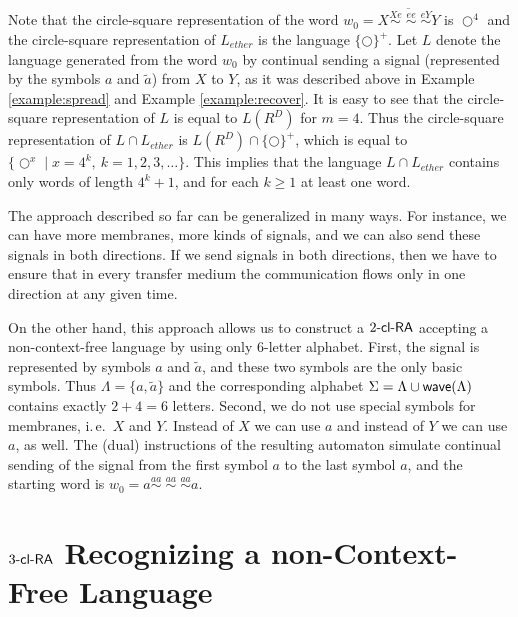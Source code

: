 Note that the circle-square representation of the word $w_0 = \overline{X \stackrel{Xe}{\sim} \; \stackrel{ee}{\sim} \; \stackrel{eY}{\sim} Y}$ is $\Circle^4$ and the circle-square representation of $L_{ether}$ is the language $\{\Circle\}^+$. Let $L$ denote the language generated from the word $w_0$ by continual sending a signal (represented by the symbols $a$ and $\tilde{a}$) from $X$ to $Y$, as it was described above  in Example \ref{example:spread} and Example \ref{example:recover}. It is easy to see that the circle-square representation of $L$ is equal to $L(R^D)$ for $m=4$. Thus the circle-square representation of $L \cap L_{ether}$ is $L(R^D)\cap \{\Circle\}^+$, which is equal to $\{\Circle^{x} \mid x = 4^k, \ k = 1, 2, 3, \ldots\}$. This implies that the language $L \cap L_{ether}$ contains only words of length $4^k + 1$, and for each $k \ge 1$ at least one word.

The approach described so far can be generalized in many ways. For instance, we can have more membranes, more kinds of signals, and we can also send these signals in both directions. If we send signals in both directions, then we have to ensure that in every transfer medium the communication flows only in one direction at any given time.

On the other hand, this approach allows us to construct a $\kclRA[2]$ accepting a non-context-free language by using only $6$-letter alphabet. First, the signal is represented by symbols $a$ and $\tilde{a}$, and these two symbols are the only basic symbols. Thus $\Lambda = \{a, \tilde{a}\}$ and the corresponding alphabet $\Sigma = \Lambda \cup \wave(\Lambda)$ contains exactly $2 + 4 = 6$ letters. Second, we do not use special symbols for membranes, i.\,e.\ $X$ and $Y$. Instead of $X$ we can use $a$ and instead of $Y$ we can use $a$, as well. The (dual) instructions of the resulting automaton simulate continual sending of the signal from the first symbol $a$ to the last symbol $a$, and the starting word is $w_0 = a \stackrel{aa}{\sim} \; \stackrel{aa}{\sim} \; \stackrel{aa}{\sim} a$.

\section[\texorpdfstring{$\kclRA[3]$ Recognizing a non-Context-Free Language}%
                        {3-cl-RA Recognizing a non-CFL}]%
                        {$\kclRA[3]$ Recognizing a non-Context-Free Language}%
\label{3clRA-non-CFL}
\index{$\kclRA[3]$}


